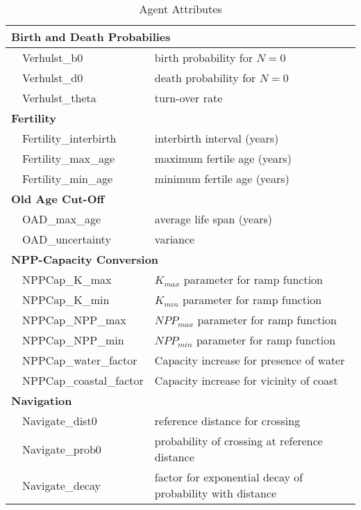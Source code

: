 \documentclass[a4paper,oneside]{article}
\begin{document}
\begin{table}[ht!]
  \begin{center}
  \caption{Agent Attributes}
  \label{tab:agt}
  \begin{tabular}{cl|l}
    \hline
    \multicolumn{3}{l}{\bf{Birth and Death Probabilies}}           \\
    \hline
    \space & Verhulst\_b0                  &  birth probability for $N=0$   \\
    \space & Verhulst\_d0                  &  death probability for $N=0$   \\
    \space & Verhulst\_theta               &  turn-over rate                \\
    \hline 
    \multicolumn{3}{l}{\bf{Fertility}}                                      \\
    \hline
    \space & Fertility\_interbirth         &  interbirth interval (years)   \\
    \space & Fertility\_max\_age           &  maximum fertile age (years)   \\
    \space & Fertility\_min\_age           &  minimum fertile age (years)   \\
    \hline
    \multicolumn{3}{l}{\bf{Old Age Cut-Off}}                                \\
    \hline
    \space & OAD\_max\_age                 &  average life span   (years)   \\
    \space & OAD\_uncertainty              &  variance                      \\
    \hline
    \multicolumn{3}{l}{\bf{NPP-Capacity Conversion}}                                 \\
    \hline
    \space & NPPCap\_K\_max                & $K_{max}$ parameter for ramp function   \\
    \space & NPPCap\_K\_min                & $K_{min}$ parameter for ramp function   \\
    \space & NPPCap\_NPP\_max              & $NPP_{max}$ parameter for ramp function \\
    \space & NPPCap\_NPP\_min              & $NPP_{min}$ parameter for ramp function \\
    \space & NPPCap\_water\_factor         & Capacity increase for presence of water \\
    \space & NPPCap\_coastal\_factor       & Capacity increase for vicinity of coast \\

    \multicolumn{2}{l}{\bf{Navigation}}                                \\
    \hline
    \space & Navigate\_dist0               & reference distance for crossing \\
    \space & Navigate\_prob0               & probability of crossing at reference distance \\
    \space & Navigate\_decay               & factor for exponential decay of probability with distance \\
  \end{tabular}

  \end{center}
\end{table}
\end{document}
